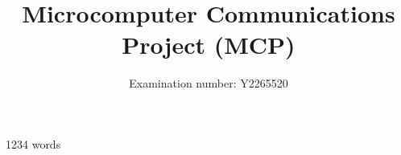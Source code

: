 \documentclass[a4paper,10pt]{article}
\title{Microcomputer Communications Project (MCP)}
\author{Examination number: Y2265520}
\begin{document}
\maketitle
\begin{center}
1234 words
\end{center}
\pagebreak
\tableofcontents








\appendix

\pagebreak
\begin{thebibliography}{99}
\end{thebibliography}
\end{document}
